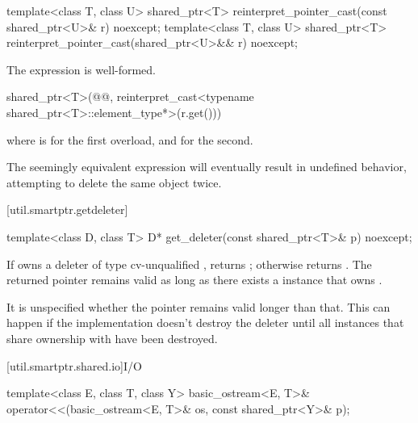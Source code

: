 %
\begin{itemdecl}
template<class T, class U>
  shared_ptr<T> reinterpret_pointer_cast(const shared_ptr<U>& r) noexcept;
template<class T, class U>
  shared_ptr<T> reinterpret_pointer_cast(shared_ptr<U>&& r) noexcept;
\end{itemdecl}

\begin{itemdescr}
\pnum
\mandates
The expression  is well-formed.

\pnum
\returns
\begin{codeblock}
shared_ptr<T>(@@, reinterpret_cast<typename shared_ptr<T>::element_type*>(r.get()))
\end{codeblock}
where  is  for the first overload, and
 for the second.

\pnum
\begin{note}
The seemingly equivalent expression
 will eventually result in
undefined behavior, attempting to delete the same object twice.
\end{note}
\end{itemdescr}

[util.smartptr.getdeleter]{}

%
\begin{itemdecl}
template<class D, class T>
  D* get_deleter(const shared_ptr<T>& p) noexcept;
\end{itemdecl}

\begin{itemdescr}
\pnum
\returns
If  owns a deleter  of type cv-unqualified
, returns ; otherwise returns .
The returned
pointer remains valid as long as there exists a  instance
that owns .
\begin{note}
It is unspecified whether the pointer
remains valid longer than that. This can happen if the implementation doesn't destroy
the deleter until all  instances that share ownership with
 have been destroyed.
\end{note}
\end{itemdescr}

[util.smartptr.shared.io]{I/O}

%
\begin{itemdecl}
template<class E, class T, class Y>
  basic_ostream<E, T>& operator<<(basic_ostream<E, T>& os, const shared_ptr<Y>& p);
\end{itemdecl}

